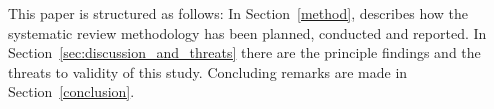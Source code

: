 This paper is structured as follows: In Section~\ref{method}, describes how the systematic review methodology has been planned, conducted and reported. In Section~\ref{sec:discussion_and_threats} there are the principle findings and the threats to validity of this study. Concluding remarks are made in Section~\ref{conclusion}.